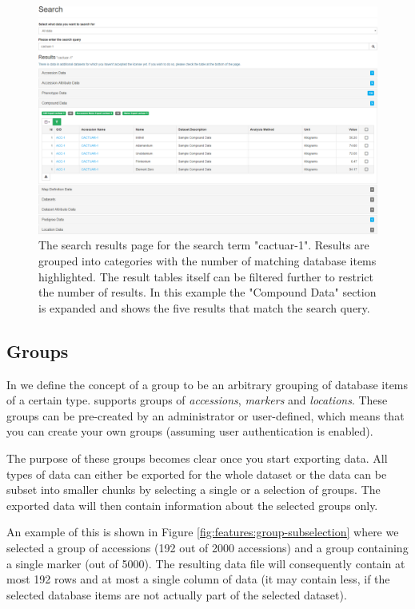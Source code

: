 \begin{figure}
	\centering
	\includegraphics[width=0.85\linewidth]{img/features/search.png}
	\caption{The search results page for the search term "cactuar-1". Results are grouped into categories with the number of matching database items highlighted. The result tables itself can be filtered further to restrict the number of results. In this example the "Compound Data" section is expanded and shows the five results that match the search query.}
	\label{fig:features:search}
\end{figure}

\subsection{Groups}
In {\germinate} we define the concept of a group to be an arbitrary grouping of database items of a certain type. {\germinate} supports groups of \textit{accessions}, \textit{markers} and \textit{locations}. These groups can be pre-created by an administrator or user-defined, which means that you can create your own groups (assuming user authentication is enabled).

The purpose of these groups becomes clear once you start exporting data. All types of data can either be exported for the whole dataset or the data can be subset into smaller chunks by selecting a single or a selection of groups. The exported data will then contain information about the selected groups only.

An example of this is shown in Figure \ref{fig:features:group-subselection} where we selected a group of accessions (192 out of 2000 accessions) and a group containing a single marker (out of 5000). The resulting data file will consequently contain at most 192 rows and at most a single column of data (it may contain less, if the selected database items are not actually part of the selected dataset).

